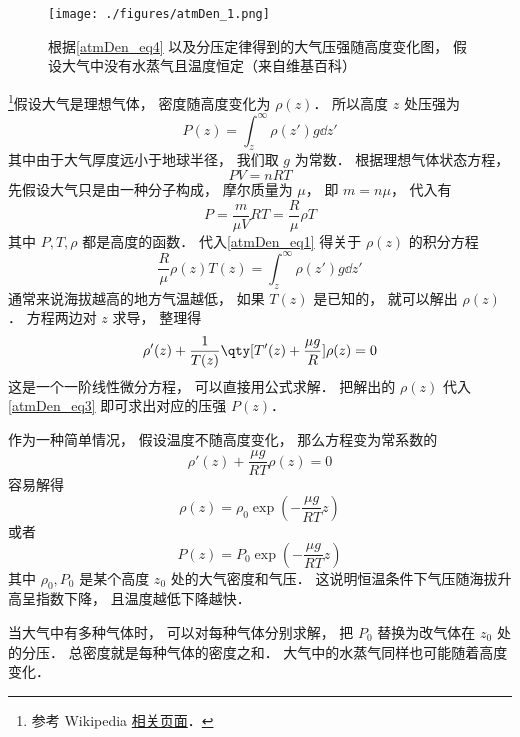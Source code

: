 

\begin{figure}[ht]
\centering
\texttt{[image: ./figures/atmDen\_1.png]}
\caption{根据\autoref{atmDen_eq4}  以及分压定律得到的大气压强随高度变化图， 假设大气中没有水蒸气且温度恒定（来自维基百科）}\label{atmDen_fig1}
\end{figure}

\footnote{参考 Wikipedia \href{https://en.wikipedia.org/wiki/Atmospheric_pressure}{相关页面}．}假设大气是理想气体， 密度随高度变化为 $\rho(z)$． 所以高度 $z$ 处压强为
\begin{equation}\label{atmDen_eq1}
P(z) = \int_{z}^\infty \rho(z') g \dd{z'}
\end{equation}
其中由于大气厚度远小于地球半径， 我们取 $g$ 为常数． 根据理想气体状态方程，
\begin{equation}
PV = n R T
\end{equation}
先假设大气只是由一种分子构成， 摩尔质量为 $\mu$， 即 $m = n\mu$， 代入有
\begin{equation}\label{atmDen_eq3}
P = \frac{m}{\mu V} RT = \frac{R}{\mu} \rho T
\end{equation}
其中 $P, T, \rho$ 都是高度的函数． 代入\autoref{atmDen_eq1} 得关于 $\rho(z)$ 的积分方程 %
\begin{equation}
\frac{R}{\mu} \rho(z) T(z) = \int_{z}^\infty \rho(z') g \dd{z'}
\end{equation}
通常来说海拔越高的地方气温越低， 如果 $T(z)$ 是已知的， 就可以解出 $\rho(z)$． 方程两边对 $z$ 求导， 整理得
\begin{equation}
\rho'(z)  +  \frac{1}{T(z)}\qty[T'(z) + \frac{\mu g}{R}]\rho(z) = 0
\end{equation}
这是一个一阶线性微分方程， 可以直接用公式求解． 把解出的 $\rho(z)$ 代入\autoref{atmDen_eq3} 即可求出对应的压强 $P(z)$．

作为一种简单情况， 假设温度不随高度变化， 那么方程变为常系数的
\begin{equation}
\rho'(z)  +  \frac{\mu g}{RT}\rho(z) = 0
\end{equation}
容易解得
\begin{equation}\label{atmDen_eq2}
\rho(z) = \rho_0\exp(-\frac{\mu g}{RT} z)
\end{equation}
或者
\begin{equation}\label{atmDen_eq4}
P(z) = P_0\exp(-\frac{\mu g}{RT} z)
\end{equation}
其中 $\rho_0, P_0$ 是某个高度 $z_0$ 处的大气密度和气压． 这说明恒温条件下气压随海拔升高呈指数下降， 且温度越低下降越快．

当大气中有多种气体时， 可以对每种气体分别求解， 把 $P_0$ 替换为改气体在 $z_0$ 处的分压． 总密度就是每种气体的密度之和． 大气中的水蒸气同样也可能随着高度变化．
